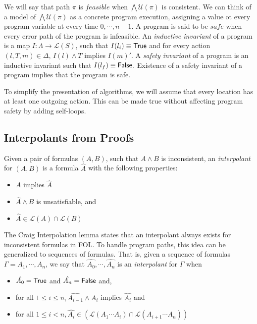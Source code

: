 We will say that path $\pi$ is $feasible$ when $\bigwedge \mathcal{U}(\pi)$ is consistent. We can think of a model of $\bigwedge \mathcal{U}(\pi)$ as a concrete program execution, assigning a value ot every program variable at every time $0, \cdots, n-1$. A program is said to be $safe$ when every error path of the program is infeasible. An \textit{inductive invariant} of a program is a map $I : \Lambda \rightarrow \mathcal{L}(S)$, such that $I(l_i) \equiv \mathsf{True}$ and for every action $(l, T, m) \in \Delta$, $I(l) \wedge T$ implies $I(m)'$. A \textit{safety invariant} of a program is an inductive invariant such that $I(l_f) \equiv \mathsf{False}$. Existence of a safety invariant of a program implies that the program is safe.

To simplify the presentation of algorithms, we will assume that every location has at least one outgoing action. This can be made true without affecting program safety by adding self-loops.

\subsection{Interpolants from Proofs}

Given a pair of formulas $(A,B)$, such that $A \wedge B$ is inconsistent, an \textit{interpolant} for $(A,B)$ is a formula $\hat{A}$ with the following properties:

\begin{itemize}
  \item $A$ implies $\hat{A}$
  \item $\hat{A} \wedge B$ is unsatisfiable, and
  \item $\hat{A} \in \mathcal{L}(A) \cap \mathcal{L}(B)$
\end{itemize}

The Craig Interpolation lemma \cite{craig1957} states that an interpolant always exists for inconsistent formulas in FOL. To handle program paths, this idea can be generalized to sequences of formulas. That is, given a sequence of formulas $\Gamma = A_1, \cdots , A_n$, we say that $\hat{A_0},\cdots, \hat{A_n}$ is an \textit{interpolant} for $\Gamma$ when

\begin{itemize}
  \item $\hat{A_0} = \mathsf{True}$ and $\hat{A_n} = \mathsf{False}$ and,
  \item for all $1 \leq i \leq n, \hat{A_{i-1}} \wedge A_i$ implies $\hat{A_i}$ and
  \item for all $1 \leq i < n, \hat{A_i} \in (\mathcal{L}(A_1 \cdots A_i) \cap \mathcal{L}(A_{i+1}\cdots A_n))$
\end{itemize}

